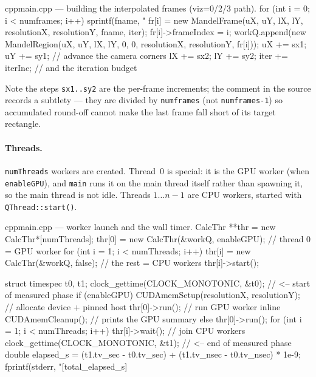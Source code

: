 \documentclass[
	english,
	letterpaper, oneside
]{article}
\begin{document}
\begin{sourcecode}{cpp}{main.cpp --- building the interpolated frames (viz=0/2/3 path).}
for (int i = 0; i < numframes; i++) {
    sprintf(fname, "%
    fr[i] = new MandelFrame(uX, uY, lX, lY, resolutionX, resolutionY, fname, iter);
    fr[i]->frameIndex = i;
    workQ.append(new MandelRegion(uX, uY, lX, lY, 0, 0,
                                  resolutionX, resolutionY, fr[i]));
    uX += sx1;  uY += sy1;          // advance the camera corners
    lX += sx2;  lY += sy2;
    iter += iterInc;                // and the iteration budget
}
\end{sourcecode}

Note the steps \texttt{sx1..sy2} are the per-frame increments; the comment in the
source records a subtlety --- they are divided by \texttt{numframes} (not
\texttt{numframes-1}) so accumulated round-off cannot make the last frame fall
short of its target rectangle.

\paragraph{Threads.} \texttt{numThreads} workers are created. Thread~0 is special:
it is the GPU worker (when \texttt{enableGPU}), and \texttt{main} runs it on the
main thread itself rather than spawning it, so the main thread is not idle.
Threads $1\ldots n{-}1$ are CPU workers, started with \texttt{QThread::start()}.

\begin{sourcecode}{cpp}{main.cpp --- worker launch and the wall timer.}
CalcThr **thr = new CalcThr*[numThreads];
thr[0] = new CalcThr(&workQ, enableGPU);          // thread 0 = GPU worker
for (int i = 1; i < numThreads; i++) {
    thr[i] = new CalcThr(&workQ, false);          // the rest = CPU workers
    thr[i]->start();
}

struct timespec t0, t1;
clock_gettime(CLOCK_MONOTONIC, &t0);              // <-- start of measured phase
if (enableGPU) {
    CUDAmemSetup(resolutionX, resolutionY);       // allocate device + pinned host
    thr[0]->run();                                // run GPU worker inline
    CUDAmemCleanup();                             // prints the GPU summary
} else
    thr[0]->run();
for (int i = 1; i < numThreads; i++) thr[i]->wait();   // join CPU workers
clock_gettime(CLOCK_MONOTONIC, &t1);              // <-- end of measured phase
double elapsed_s = (t1.tv_sec - t0.tv_sec) + (t1.tv_nsec - t0.tv_nsec) * 1e-9;
fprintf(stderr, "[total_elapsed_s] %
\end{sourcecode}
\end{document}
